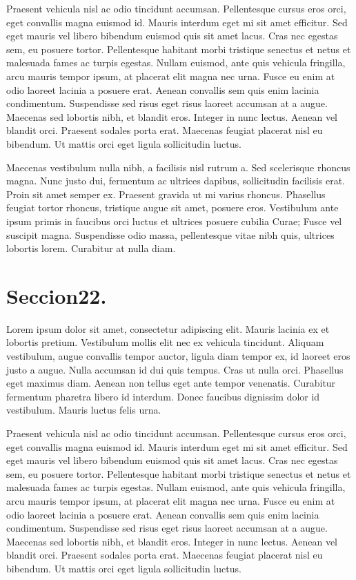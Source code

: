 Praesent vehicula nisl ac odio tincidunt accumsan. Pellentesque cursus eros orci, eget convallis magna euismod id. Mauris interdum eget mi sit amet efficitur. Sed eget mauris vel libero bibendum euismod quis sit amet lacus. Cras nec egestas sem, eu posuere tortor. Pellentesque habitant morbi tristique senectus et netus et malesuada fames ac turpis egestas. Nullam euismod, ante quis vehicula fringilla, arcu mauris tempor ipsum, at placerat elit magna nec urna. Fusce eu enim at odio laoreet lacinia a posuere erat. Aenean convallis sem quis enim lacinia condimentum. Suspendisse sed risus eget risus laoreet accumsan at a augue. Maecenas sed lobortis nibh, et blandit eros. Integer in nunc lectus. Aenean vel blandit orci. Praesent sodales porta erat. Maecenas feugiat placerat nisl eu bibendum. Ut mattis orci eget ligula sollicitudin luctus.

Maecenas vestibulum nulla nibh, a facilisis nisl rutrum a. Sed scelerisque rhoncus magna. Nunc justo dui, fermentum ac ultrices dapibus, sollicitudin facilisis erat. Proin sit amet semper ex. Praesent gravida ut mi varius rhoncus. Phasellus feugiat tortor rhoncus, tristique augue sit amet, posuere eros. Vestibulum ante ipsum primis in faucibus orci luctus et ultrices posuere cubilia Curae; Fusce vel suscipit magna. Suspendisse odio massa, pellentesque vitae nibh quis, ultrices lobortis lorem. Curabitur at nulla diam. 


\section{Seccion22.}

Lorem ipsum dolor sit amet, consectetur adipiscing elit. Mauris lacinia ex et lobortis pretium. Vestibulum mollis elit nec ex vehicula tincidunt. Aliquam vestibulum, augue convallis tempor auctor, ligula diam tempor ex, id laoreet eros justo a augue. Nulla accumsan id dui quis tempus. Cras ut nulla orci. Phasellus eget maximus diam. Aenean non tellus eget ante tempor venenatis. Curabitur fermentum pharetra libero id interdum. Donec faucibus dignissim dolor id vestibulum. Mauris luctus felis urna.

Praesent vehicula nisl ac odio tincidunt accumsan. Pellentesque cursus eros orci, eget convallis magna euismod id. Mauris interdum eget mi sit amet efficitur. Sed eget mauris vel libero bibendum euismod quis sit amet lacus. Cras nec egestas sem, eu posuere tortor. Pellentesque habitant morbi tristique senectus et netus et malesuada fames ac turpis egestas. Nullam euismod, ante quis vehicula fringilla, arcu mauris tempor ipsum, at placerat elit magna nec urna. Fusce eu enim at odio laoreet lacinia a posuere erat. Aenean convallis sem quis enim lacinia condimentum. Suspendisse sed risus eget risus laoreet accumsan at a augue. Maecenas sed lobortis nibh, et blandit eros. Integer in nunc lectus. Aenean vel blandit orci. Praesent sodales porta erat. Maecenas feugiat placerat nisl eu bibendum. Ut mattis orci eget ligula sollicitudin luctus.

